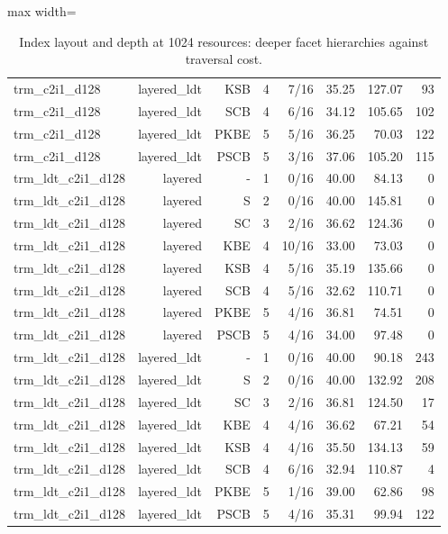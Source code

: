 \begin{table}[t]
\begin{adjustbox}{max width=\linewidth}
\begin{tabular}{lrrrrrrr}
trm\_c2i1\_d128 & layered\_ldt & KSB & 4 & 7/16 & 35.25 & 127.07 & 93 \\
trm\_c2i1\_d128 & layered\_ldt & SCB & 4 & 6/16 & 34.12 & 105.65 & 102 \\
trm\_c2i1\_d128 & layered\_ldt & PKBE & 5 & 5/16 & 36.25 & 70.03 & 122 \\
trm\_c2i1\_d128 & layered\_ldt & PSCB & 5 & 3/16 & 37.06 & 105.20 & 115 \\
trm\_ldt\_c2i1\_d128 & layered & - & 1 & 0/16 & 40.00 & 84.13 & 0 \\
trm\_ldt\_c2i1\_d128 & layered & S & 2 & 0/16 & 40.00 & 145.81 & 0 \\
trm\_ldt\_c2i1\_d128 & layered & SC & 3 & 2/16 & 36.62 & 124.36 & 0 \\
trm\_ldt\_c2i1\_d128 & layered & KBE & 4 & 10/16 & 33.00 & 73.03 & 0 \\
trm\_ldt\_c2i1\_d128 & layered & KSB & 4 & 5/16 & 35.19 & 135.66 & 0 \\
trm\_ldt\_c2i1\_d128 & layered & SCB & 4 & 5/16 & 32.62 & 110.71 & 0 \\
trm\_ldt\_c2i1\_d128 & layered & PKBE & 5 & 4/16 & 36.81 & 74.51 & 0 \\
trm\_ldt\_c2i1\_d128 & layered & PSCB & 5 & 4/16 & 34.00 & 97.48 & 0 \\
trm\_ldt\_c2i1\_d128 & layered\_ldt & - & 1 & 0/16 & 40.00 & 90.18 & 243 \\
trm\_ldt\_c2i1\_d128 & layered\_ldt & S & 2 & 0/16 & 40.00 & 132.92 & 208 \\
trm\_ldt\_c2i1\_d128 & layered\_ldt & SC & 3 & 2/16 & 36.81 & 124.50 & 17 \\
trm\_ldt\_c2i1\_d128 & layered\_ldt & KBE & 4 & 4/16 & 36.62 & 67.21 & 54 \\
trm\_ldt\_c2i1\_d128 & layered\_ldt & KSB & 4 & 4/16 & 35.50 & 134.13 & 59 \\
trm\_ldt\_c2i1\_d128 & layered\_ldt & SCB & 4 & 6/16 & 32.94 & 110.87 & 4 \\
trm\_ldt\_c2i1\_d128 & layered\_ldt & PKBE & 5 & 1/16 & 39.00 & 62.86 & 98 \\
trm\_ldt\_c2i1\_d128 & layered\_ldt & PSCB & 5 & 4/16 & 35.31 & 99.94 & 122 \\
\bottomrule
\end{tabular}
\end{adjustbox}
\caption{Index layout and depth at 1024 resources: deeper facet hierarchies against traversal cost.}
\label{tab:mcp02-pilot_gpu-layout}
\end{table}
